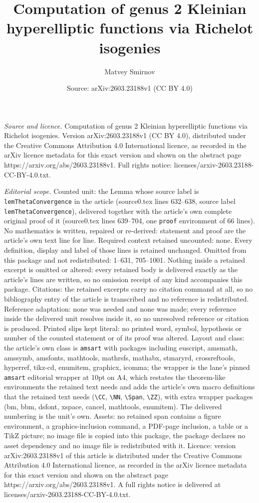 \documentclass[10pt,a4paper]{amsart}
\title[Computation of genus 2 Kleinian hyperelliptic functions via ]{Computation of genus 2 Kleinian hyperelliptic functions via Richelot isogenies}
\author{Matvey Smirnov}
\date{Source: arXiv:2603.23188v1 (CC BY 4.0)}
\begin{document}
\maketitle

\noindent\emph{Source and licence.} Computation of genus 2 Kleinian hyperelliptic functions via Richelot isogenies. Version arXiv:2603.23188v1 (CC BY 4.0), distributed under the Creative Commons Attribution 4.0 International licence, as recorded in the arXiv licence metadata for this exact version and shown on the abstract page https://arxiv.org/abs/2603.23188v1. Full rights notice: licenses/arxiv-2603.23188-CC-BY-4.0.txt.\par\smallskip

\noindent\textit{Editorial scope.} Counted unit: the Lemma whose source label is \texttt{lemThetaConvergence} in the article (source0.tex lines 632--638, source label \texttt{lemThetaConvergence}), delivered together with the article's own complete original proof of it (source0.tex lines 639--704, one \texttt{proof} environment of 66 lines). No mathematics is written, repaired or re-derived: statement and proof are the article's own text line for line. Required context retained uncounted: none. Every definition, display and label of those lines is retained unchanged. Omitted from this package and not redistributed: 1--631, 705--1001. Nothing inside a retained excerpt is omitted or altered: every retained body is delivered exactly as the article's lines are written, so no omission receipt of any kind accompanies this package. Citations: the retained excerpts carry no citation command at all, so no bibliography entry of the article is transcribed and no reference is redistributed. Reference adaptation: none was needed and none was made; every reference inside the delivered unit resolves inside it, so no unresolved reference or citation is produced. Printed slips kept literal: no printed word, symbol, hypothesis or number of the counted statement or of its proof was altered. Layout and class: the article's own class is \texttt{amsart} with packages including euscript, amsmath, amssymb, amsfonts, mathtools, mathrsfs, mathabx, stmaryrd, crossreftools, hyperref, tikz-cd, enumitem, graphicx, icomma; the wrapper is the lane's pinned \texttt{amsart} editorial wrapper at 10pt on A4, which restates the theorem-like environments the retained text needs and adds the article's own macro definitions that the retained text needs (\texttt{\textbackslash CC}, \texttt{\textbackslash NN}, \texttt{\textbackslash Span}, \texttt{\textbackslash ZZ}), with extra wrapper packages (bm, bbm, dsfont, xspace, cancel, mathtools, enumitem). The delivered numbering is the unit's own. Assets: no retained span contains a figure environment, a graphics-inclusion command, a PDF-page inclusion, a table or a TikZ picture; no image file is copied into this package, the package declares no asset dependency and no image file is redistributed with it. Licence: version arXiv:2603.23188v1 of this article is distributed under the Creative Commons Attribution 4.0 International licence, as recorded in the arXiv licence metadata for this exact version and shown on the abstract page https://arxiv.org/abs/2603.23188v1. A full rights notice is delivered at licenses/arxiv-2603.23188-CC-BY-4.0.txt. 
\end{document}
